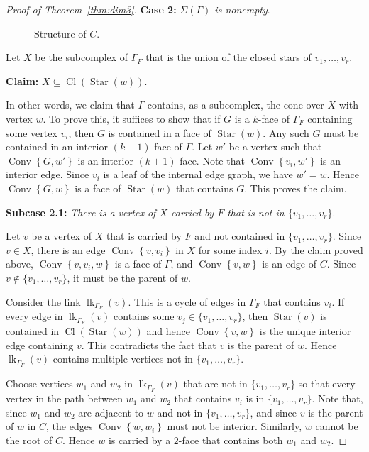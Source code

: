 \documentclass[10pt]{amsart}
\DeclareMathOperator{\Cl}{Cl}
\DeclareMathOperator{\Convop}{Conv}
\newcommand{\Conv}[1]{\Convop\left\{{#1}\right\}}
\DeclareMathOperator{\lk}{lk}
\DeclareMathOperator{\Star}{Star}
\newenvironment{proofsection}[2]{\par\smallskip\noindent\textbf{#1} \emph{#2}.\par\nobreak}{\par\smallskip}
\begin{document}
\begin{proof}[Proof of Theorem~\ref{thm:dim3}]
\begin{proofsection}{Case 2:}{$\Sigma(\Gamma)$ is nonempty}
\begin{figure}[htb]
\vspace*{-2mm}
\caption{Structure of $C$.}
\label{fig:possible-sigma}
\end{figure}

Let $X$ be the subcomplex of $\Gamma_F$ that is the union of the closed stars of $v_1, \ldots, v_r$. 
\end{proofsection}

\goodbreak
\begin{proofsection}{Claim:} {$X \subseteq \Cl(\Star(w))$}

In other words, we claim that $\Gamma$ contains, as a subcomplex, the cone over $X$ with vertex $w$. To prove this, it suffices to show that if $G$ is a $k$-face of $\Gamma_F$ containing some vertex $v_i$, then $G$ is contained in a face of $\Star(w)$. Any such $G$ must be contained in an interior $(k+1)$-face of $\Gamma$. Let $w'$ be a vertex such that $\Conv{G,w'}$ is an interior $(k+1)$-face. Note that $\Conv{v_i,w'}$ is an interior edge. Since $v_i$ is a leaf of the internal edge graph, we have $w'=w$. Hence $\Conv{G,w}$ is a face of $\Star(w)$ that contains $G$. This proves the claim.
\end{proofsection}

\begin{proofsection}{Subcase 2.1:} {There is a vertex of $X$ carried by $F$ that is not in $\{ v_1, \ldots, v_r \}$}
Let $v$ be a vertex of $X$ that is carried by $F$ and not contained in $\{v_1, \ldots, v_r\}$. Since $v\in X$, there is an edge $\Conv{v,v_i}$ in $X$ for some index $i$. By the claim proved above, $\Conv{v,v_i,w}$ is a face of $\Gamma$, and $\Conv{v,w}$ is an edge of $C$. Since $v \not \in \{v_1, \ldots, v_r\}$, it must be the parent of $w$. 

Consider the link $\lk_{\Gamma_F}(v)$. This is a cycle of edges in $\Gamma_F$ that contains $v_i$. If every edge in $\lk_{\Gamma_F}(v)$ contains some $v_j \in \{ v_1, \ldots, v_r \}$, then $\Star(v)$ is contained in $\Cl(\Star(w))$ and hence $\Conv{v,w}$ is the unique interior edge containing $v$. This contradicts the fact that $v$ is the parent of $w$. Hence $\lk_{\Gamma_F}(v)$ contains multiple vertices not in $\{v_1, \ldots, v_r \}$.

Choose vertices $w_1$ and $w_2$ in $\lk_{\Gamma_F}(v)$ that are not in $\{v_1, \ldots, v_r\}$ so that every vertex in the path between $w_1$ and $w_2$ that contains $v_i$ is in $\{v_1, \ldots, v_r\}$. Note that, since $w_1$ and $w_2$ are adjacent to $w$ and not in $\{v_1, \ldots, v_r \}$, and since $v$ is the parent of $w$ in $C$, the edges $\Conv{w,w_i}$ must not be interior. Similarly, $w$ cannot be the root of $C$. Hence $w$ is carried by a $2$-face that contains both $w_1$ and $w_2$. 


\end{proofsection}
\end{proof}
\end{document}
